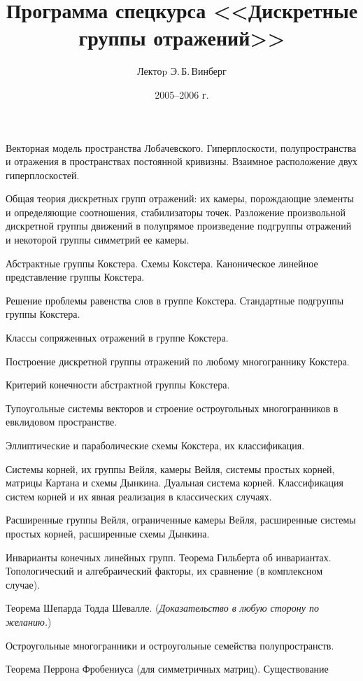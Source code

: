 \documentclass[a4paper]{article}
\title{Программа спецкурса <<Дискретные группы отражений>>}
\author{Лектоp Э.\,Б.\,Винберг}
\date{2005--2006 г.}
\begin{document}
\maketitle

\begin{nums}{0}
\item Векторная модель пространства Лобачевского. Гиперплоскости,
      полупространства и отражения в пространствах постоянной кривизны.
      Взаимное расположение двух гиперплоскостей.
\item Общая теория дискретных групп отражений: их камеры, порождающие
      элементы и определяющие соотношения, стабилизаторы точек. Разложение
      произвольной дискретной группы движений в полупрямое произведение
      подгруппы отражений и некоторой группы симметрий ее камеры.
\item Абстрактные группы Кокстера. Схемы Кокстера. Каноническое линейное
      представление группы Кокстера.
\item Решение проблемы равенства слов в группе Кокстера. Стандартные
      подгруппы группы Кокстера.
\item Классы сопряженных отражений в группе Кокстера.
\item Построение дискретной группы отражений по любому многограннику Кокстера.
\item Критерий конечности абстрактной группы Кокстера.
\item Тупоугольные системы векторов и строение остроугольных многогранников
      в евклидовом пространстве.
\item Эллиптические и параболические схемы Кокстера, их классификация.
\item Системы корней, их группы Вейля, камеры Вейля, системы простых корней,
      матрицы Картана и схемы Дынкина. Дуальная система корней.
      Классификация систем корней и их явная реализация в классических случаях.
\item Расширенные группы Вейля, ограниченные камеры Вейля, расширенные
      системы простых корней, расширенные схемы Дынкина.
\item Инварианты конечных линейных групп. Теорема Гильберта об инвариантах.
      Топологический и алгебраический факторы, их сравнение (в комплексном случае).
\item Теорема Шепарда Тодда Шевалле. (\emph{Доказательство в любую сторону по желанию.})
\item Остроугольные многогранники и остроугольные семейства полупространств.
\item Теорема Перрона Фробениуса (для симметричных матриц). Существование

\end{nums}
\end{document}
